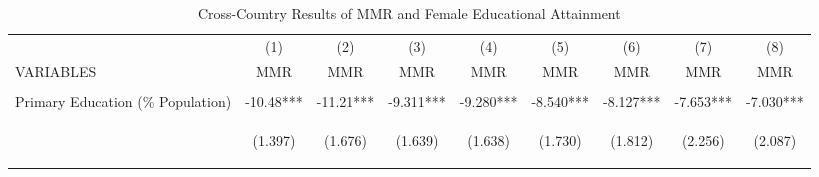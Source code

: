 \begin{landscape}
\begin{table}[htpb!]											
\begin{center}											
\caption{Cross-Country Results of MMR and Female Educational Attainment}											
\vspace{-6mm}											
\label{tab:MMR}											
\begin{tabular}{lcccccccc}	\toprule																	
	&	(1)	&	(2)	&	(3)	&	(4)	&	(5)	&	(6)	&	(7)	&	(8)	\\	
VARIABLES	&	MMR	&	MMR	&	MMR	&	MMR	&	MMR	&	MMR	&	MMR	&	MMR	\\	\midrule
\vspace{4pt}	&	\begin{footnotesize}\end{footnotesize}	&	\begin{footnotesize}\end{footnotesize}	&	\begin{footnotesize}\end{footnotesize}	&	\begin{footnotesize}\end{footnotesize}	&	\begin{footnotesize}\end{footnotesize}	&	\begin{footnotesize}\end{footnotesize}	&	\begin{footnotesize}\end{footnotesize}	&	\begin{footnotesize}\end{footnotesize}	\\	
Primary Education (\% Population)	&	-10.48***	&	-11.21***	&	-9.311***	&	-9.280***	&	-8.540***	&	-8.127***	&	-7.653***	&	-7.030***	\\	
	& \begin{footnotesize}	(1.397)	\end{footnotesize} & \begin{footnotesize}	(1.676)	\end{footnotesize} & \begin{footnotesize}	(1.639)	\end{footnotesize} & \begin{footnotesize}	(1.638)	\end{footnotesize} & \begin{footnotesize}	(1.730)	\end{footnotesize} & \begin{footnotesize}	(1.812)	\end{footnotesize} & \begin{footnotesize}	(2.256)	\end{footnotesize} & \begin{footnotesize}	(2.087)	\end{footnotesize} \\	

\end{tabular}
\end{center}
\end{table}
\end{landscape}
